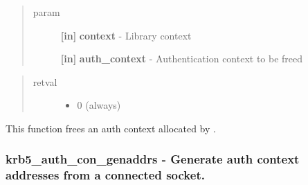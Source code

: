\documentclass[letterpaper,10pt,english]{sphinxmanual}
\begin{document}
\begin{quote}\begin{description}
\item[{param}] \leavevmode
\textbf{{[}in{]}} \textbf{context} - Library context

\textbf{{[}in{]}} \textbf{auth\_context} - Authentication context to be freed

\end{description}\end{quote}
\begin{quote}\begin{description}
\item[{retval}] \leavevmode\begin{itemize}
\item {} 
0   (always)

\end{itemize}

\end{description}\end{quote}

This function frees an auth context allocated by {\hyperref[appdev/refs/api/krb5_auth_con_init:krb5_auth_con_init]{}} .


\subsubsection{krb5\_auth\_con\_genaddrs -  Generate auth context addresses from a connected socket.}
\label{appdev/refs/api/krb5_auth_con_genaddrs::doc}\label{appdev/refs/api/krb5_auth_con_genaddrs:krb5-auth-con-genaddrs-generate-auth-context-addresses-from-a-connected-socket}

\begin{fulllineitems}
\label{appdev/refs/api/krb5_auth_con_genaddrs:krb5_auth_con_genaddrs}
\end{fulllineitems}
\end{document}
